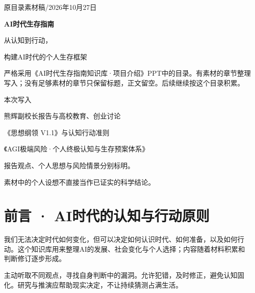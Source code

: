\documentclass[UTF8,zihao=-4,fontset=fandol,oneside,openany]{ctexbook}
\newenvironment{keybox}[1]{\begin{tcolorbox}[title={#1}]}{\end{tcolorbox}}
\begin{document}
\hypersetup{pageanchor=false}
\begin{titlepage}
\thispagestyle{empty}\setlength{\parindent}{0pt}
\vspace*{14mm}
{\large\color{Teal}原目录素材稿\quad /\quad 2026年10月27日\par}
\vspace{21mm}
{\fontsize{30}{42}\selectfont\bfseries\color{Ink}AI时代生存指南\par}
\vspace{9mm}
{\fontsize{20}{30}\selectfont\color{Ink}从认知到行动，\par 构建AI时代的个人生存框架\par}
\vspace{13mm}
\noindent{\color{Teal}\rule{\textwidth}{1.1pt}}\par
\vspace{10mm}
\begin{keybox}{编排原则}
严格采用《AI时代生存指南知识库·项目介绍》PPT中的目录。有素材的章节整理写入；没有足够素材的章节只保留标题，正文留空。后续继续按这个目录积累。
\end{keybox}
\vspace{7mm}
{\large 本次写入\par}
\vspace{3mm}
熊辉副校长报告与高校教育、创业讨论\par
《思想纲领 V1.1》与认知行动准则\par
《AGI极端风险·个人终极认知与生存预案体系》\par
\vfill
{\small\color{Soft}报告观点、个人思想与风险情景分别标明。\par 素材中的个人设想不直接当作已证实的科学结论。\par}
\end{titlepage}
\frontmatter\hypersetup{pageanchor=true}
\chapter*{前言 · AI时代的认知与行动原则}
我们无法决定时代如何变化，但可以决定如何认识时代、如何准备，以及如何行动。这个知识库用来整理AI的发展、社会变化与个人选择；内容随着材料积累和判断修订逐步形成\cite{project}。

主动听取不同观点，寻找自身判断中的漏洞。允许犯错，及时修正，避免认知固化。研究与推演应帮助现实决定，不让持续猜测占满生活。
\end{document}

